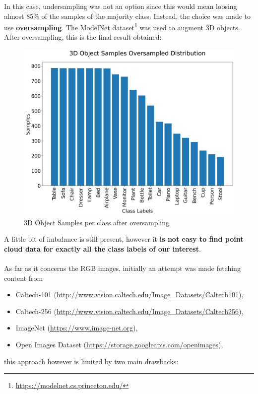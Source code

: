 \documentclass[11pt,a4paper]{article}
\begin{document}
\noindent
In this case, undersampling was not an option since this would mean loosing almost $85\%$ of the samples of the majority class. Instead, the choice was made to use \textbf{oversampling}. The ModelNet\cite{wu20153d} dataset\footnote{\url{https://modelnet.cs.princeton.edu/}} was used to augment 3D objects.\\
After oversampling, this is the final result obtained:
\begin{figure}[H]
    \centering
    \includegraphics[scale=0.35]{imgs/3d-object-oversampled-distribution.jpg}
    \caption{3D Object Samples per class after oversampling}
\end{figure}
\noindent
A little bit of imbalance is still present, however it \textbf{is not easy to find point cloud data for exactly all the class labels of our interest}.\\
\\
As far as it concerns the RGB images, initially an attempt was made fetching content from
\begin{itemize}
    \item Caltech-101 (\url{http://www.vision.caltech.edu/Image_Datasets/Caltech101}),
    \item Caltech-256 (\url{http://www.vision.caltech.edu/Image_Datasets/Caltech256}),
    \item ImageNet (\url{https://www.image-net.org}),
    \item Open Images Dataset (\url{https://storage.googleapis.com/openimages}),
\end{itemize}
this approach however is limited by two main drawbacks:
\end{document}

